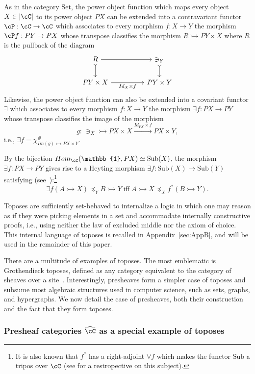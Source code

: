 \documentclass[preprint,3p,times]{elsarticle}
\newcommand{\Set}{\mathrm{Set}}
\newcommand{\Sub}{\mathrm{Sub}}
\newcommand{\mto}{\rightarrowtail}
\begin{document}
As in the category $\Set$, the power object function which maps every object $X \in |\cC|$ to its power object $PX$ can be extended into a contravariant functor $\cP : \cC \to \cC$ which associates to every morphism $f : X \to Y$ the morphism $\cP f : PY \to PX$ whose transpose classifies the morphism $R \mto PY \times X$ where $R$ is the pullback of the diagram
\[\begin{tikzcd}
	R && {\ni_Y} \\
	{PY \times X} && {PY \times Y}
	\arrow[from=1-1, to=1-3]
	\arrow[tail, from=1-3, to=2-3]
	\arrow[tail, from=1-1, to=2-1]
	\arrow["{Id_X \times f}"', from=2-1, to=2-3]
\end{tikzcd}\]
Likewise, the power object function can also be extended into a covariant functor $\exists$ which associates to every morphism $f : X \to Y$ the morphism $\exists f : PX \to PY$ whose transpose classifies the image of the morphism 
\[
g :\,\ni_X \mto PX \times X \stackrel{Id_{PX} \times f}{\to} PX \times Y,
\]
i.e., $\exists f = \chi_{Im(g) \mto PX \times Y}^\#$.

\medskip
By the bijection $Hom_\cC(\mathbb{1},PX) \simeq \Sub(X)$, the morphism $\exists f : PX \to PY$ gives rise to a Heyting morphism $\exists f : \Sub(X) \to \Sub(Y)$ satisfying (see~\cite{Johnstone02}):\footnote{It is also known that $f^*$ has a right-adjoint $\forall f$ which makes the functor $\Sub$ a tripos over $\cC$ (see \cite{Pit02} for a restropective on this subject).}
\[
    \exists f(A \mto X) \preceq_Y B \mto Y \; \mbox{iff} \; A \mto X \preceq_X f^*(B \mto Y).
\]

Toposes are sufficiently set-behaved to internalize a logic in which one may reason as if they were picking elements in a set and accommodate internally constructive proofs, i.e., using neither the law of excluded middle nor the axiom of choice.
This internal language of toposes is recalled in Appendix~\ref{sec:AppB}, and will be used in the remainder of this paper.

\medskip
There are a multitude of examples of toposes. The most emblematic is Grothendieck toposes, defined as any category equivalent to the category of sheaves over a site~\cite{Car17}. 
Interestingly, presheaves form a simpler case of toposes and subsume most algebraic structures used in computer science, such as sets, graphs, and hypergraphs.
We now detail the case of presheaves, both their construction and the fact that they form toposes.

\subsubsection{Presheaf categories \ensuremath{\widehat{\cC}} as a special example of toposes}
 
\end{document}
